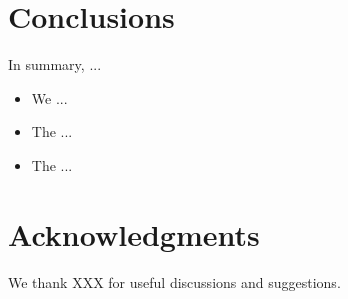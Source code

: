 \documentclass[useAMS,usenatbib]{mn2e}
\begin{document}

\section{Conclusions}
\label{sec:conclusions}

In summary, ...

\begin{itemize}

\item We ...

\item The ...

\item The ...

\end{itemize}




\section*{Acknowledgments}
 
We thank XXX for useful discussions and suggestions.



% 
% 
% 
% 





%


\label{lastpage}
\bsp
\end{document}

